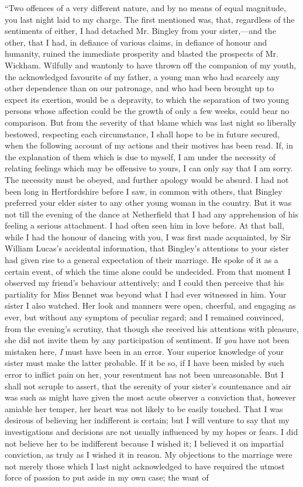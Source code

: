 ``Two offences of a very different nature, and by no means of equal magnitude, you last night laid to my charge. The first mentioned was, that, regardless of the sentiments of either, I had detached Mr. Bingley from your sister,---and the other, that I had, in defiance of various claims, in defiance of honour and humanity, ruined the immediate prosperity and blasted the prospects of Mr. Wickham. Wilfully and wantonly to have thrown off the companion of my youth, the acknowledged favourite of my father, a young man who had scarcely any other dependence than on our patronage, and who had been brought up to expect its exertion, would be a depravity, to which the separation of two young persons whose affection could be the growth of only a few weeks, could bear no comparison. But from the severity of that blame which was last night so liberally bestowed, respecting each circumstance, I shall hope to be in future secured, when the following account of my actions and their motives has been read. If, in the explanation of them which is due to myself, I am under the necessity of relating feelings which may be offensive to yours, I can only say that I am sorry. The necessity must be obeyed, and further apology would be absurd. I had not been long in Hertfordshire before I saw, in common with others, that Bingley preferred your elder sister to any other young woman in the country. But it was not till the evening of the dance at Netherfield that I had any apprehension of his feeling a serious attachment. I had often seen him in love before. At that ball, while I had the honour of dancing with you, I was first made acquainted, by Sir William Lucas's accidental information, that Bingley's attentions to your sister had given rise to a general expectation of their marriage. He spoke of it as a certain event, of which the time alone could be undecided. From that moment I observed my friend's behaviour attentively; and I could then perceive that his partiality for Miss Bennet was beyond what I had ever witnessed in him. Your sister I also watched. Her look and manners were open, cheerful, and engaging as ever, but without any symptom of peculiar regard; and I remained convinced, from the evening's scrutiny, that though she received his attentions with pleasure, she did not invite them by any participation of sentiment. If \textit{you} have not been mistaken here, \textit{I} must have been in an error. Your superior knowledge of your sister must make the latter probable. If it be so, if I have been misled by such error to inflict pain on her, your resentment has not been unreasonable. But I shall not scruple to assert, that the serenity of your sister's countenance and air was such as might have given the most acute observer a conviction that, however amiable her temper, her heart was not likely to be easily touched. That I was desirous of believing her indifferent is certain; but I will venture to say that my investigations and decisions are not usually influenced by my hopes or fears. I did not believe her to be indifferent because I wished it; I believed it on impartial conviction, as truly as I wished it in reason. My objections to the marriage were not merely those which I last night acknowledged to have required the utmost force of passion to put aside in my own case; the want of 